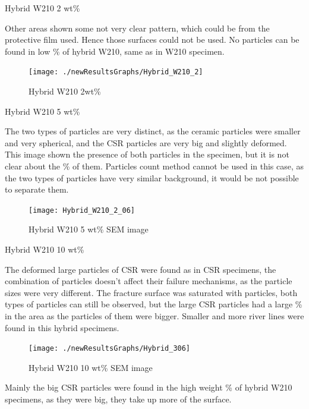 \documentclass[numbers=noendperiod,chapterprefix=on]{icldt} %
\begin{document}
{Hybrid W210 2 wt\%

Other areas shown some not very clear pattern, which could be from the protective film used. Hence those surfaces could not be used. No particles can be found in low \% of hybrid W210, same as in W210 specimen. 

\begin{figure}[!hp]
\centering
\texttt{[image: ./newResultsGraphs/Hybrid\_W210\_2]}
\caption{Hybrid W210 2wt\%} \label{Hybrid_W210_2}
\end{figure}
\FloatBarrier

Hybrid W210 5 wt\%

The two types of particles are very distinct, as the ceramic particles were smaller and very spherical, and the CSR particles are very big and slightly deformed. This image shown the presence of both particles in the specimen, but it is not clear about the \% of them. Particles count method cannot be used in this case, as the two types of particles have very similar background, it would be not possible to separate them.

\begin{figure}[!hp]
\centering
\texttt{[image: Hybrid\_W210\_2\_06]}
\caption{Hybrid W210 5 wt\% SEM image} \label{Hybrid_W210_2_06}
\end{figure}
\FloatBarrier

Hybrid W210 10 wt\%

The deformed large particles of CSR were found as in CSR specimens, the combination of particles doesn’t affect their failure mechanisms, as the particle sizes were very different. The fracture surface was saturated with particles, both types of particles can still be observed, but the large CSR particles had a large \% in the area as the particles of them were bigger.
Smaller and more river lines were found in this hybrid specimens.    

\begin{figure}[!hp]
\centering
\texttt{[image: ./newResultsGraphs/Hybrid\_306]}
\caption{Hybrid W210 10 wt\% SEM image} \label{Hybrid_306}
\end{figure}
\FloatBarrier


Mainly the big CSR particles were found in the high weight \% of hybrid W210 specimens, as they were big, they take up more of the surface. 

}
\end{document}
